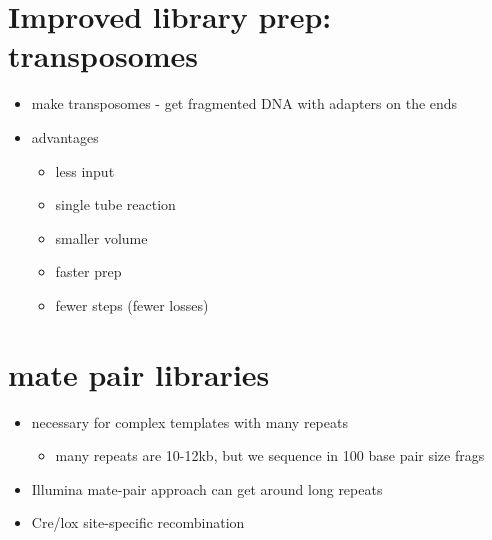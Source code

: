 \documentclass{article}
\begin{document}
    \section{Improved library prep: transposomes}
        \begin{itemize}
            \item make transposomes - get fragmented DNA with adapters on the ends
            \item advantages
            \begin{itemize}
                \item less input
                \item single tube reaction
                \item smaller volume
                \item faster prep
                \item fewer steps (fewer losses)
            \end{itemize}
        \end{itemize}

    \section{mate pair libraries}
        \begin{itemize}
            \item necessary for complex templates with many repeats
            \begin{itemize}
                \item many repeats are 10-12kb, but we sequence in 100 base pair size frags
            \end{itemize}
            \item Illumina mate-pair approach can get around long repeats
            \item Cre/lox site-specific recombination
        \end{itemize}
\end{document}
